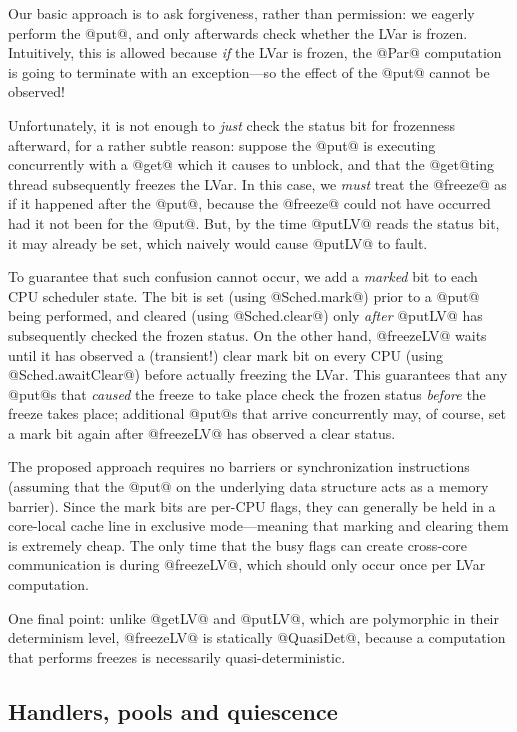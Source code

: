 Our basic approach is to ask forgiveness, rather than permission: we
eagerly perform the @put@, and only afterwards check whether the LVar
is frozen.  Intuitively, this is allowed because \emph{if} the LVar is
frozen, the @Par@ computation is going to terminate with an
exception---so the effect of the @put@ cannot be observed!

Unfortunately, it is not enough to \emph{just} check the status bit
for frozenness afterward, for a rather subtle reason: suppose the
@put@ is executing concurrently with a @get@ which it causes to
unblock, and that the @get@ting thread subsequently freezes the LVar.
In this case, we \emph{must} treat the @freeze@ as if it happened
after the @put@, because the @freeze@ could not have occurred had it
not been for the @put@. But, by the time @putLV@ reads the status bit,
it may already be set, which naively would cause @putLV@ to fault.

To guarantee that such confusion cannot occur, we add a \emph{marked}
bit to each CPU scheduler state.  The bit is set (using @Sched.mark@)
prior to a @put@ being performed, and cleared (using @Sched.clear@)
only \emph{after} @putLV@ has subsequently checked the frozen status.
On the other hand, @freezeLV@ waits until it has observed a
(transient!) clear mark bit on every CPU (using @Sched.awaitClear@)
before actually freezing the LVar.  This guarantees that any @put@s
that \emph{caused} the freeze to take place check the frozen status
\emph{before} the freeze takes place; additional @put@s that arrive
concurrently may, of course, set a mark bit again after @freezeLV@ has
observed a clear status.

The proposed approach requires no barriers or synchronization
instructions (assuming that the @put@ on the underlying data structure
acts as a memory barrier).  Since the mark bits are per-CPU flags,
they can generally be held in a core-local cache line in exclusive
mode---meaning that marking and clearing them is extremely cheap.  The
only time that the busy flags can create cross-core communication is
during @freezeLV@, which should only occur once per LVar computation.

One final point: unlike @getLV@ and @putLV@, which are polymorphic in
their determinism level, @freezeLV@ is statically @QuasiDet@, because
a computation that performs freezes is necessarily
quasi-deterministic.

\subsection{Handlers, pools and quiescence}

